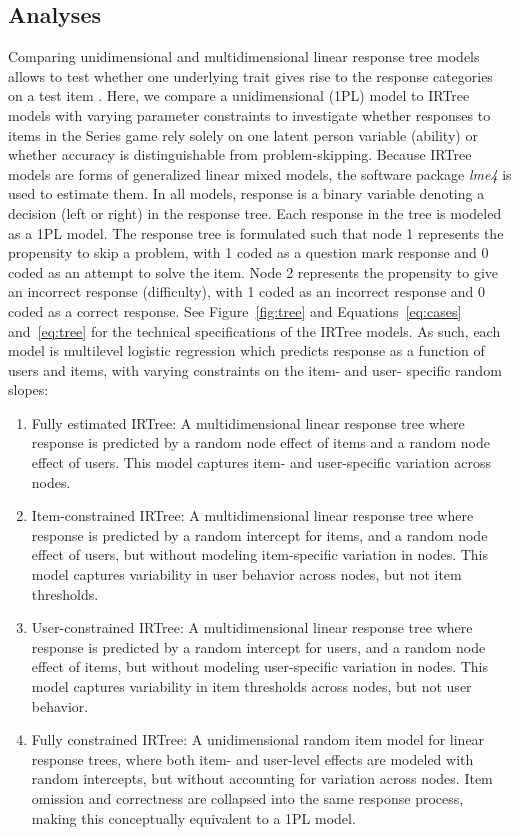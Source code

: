 \documentclass{edm_article}
\begin{document}
\subsection{Analyses}
\label{section:analyses}
Comparing unidimensional and multidimensional linear response tree models allows to test whether one underlying trait gives rise to the response categories on a test item \cite{de2012irtrees}. Here, we compare a unidimensional (1PL) model to IRTree models with varying parameter constraints to investigate whether responses to items in the Series game rely solely on one latent person variable (ability) or whether accuracy is distinguishable from problem-skipping. Because IRTree models are forms of generalized linear mixed models, the software package \textit{lme4} \cite{bates2015package} is used to estimate them. In all models, response is a binary variable denoting a decision (left or right) in the response tree. Each response in the tree is modeled as a 1PL model. The response tree is formulated such that node 1 represents the propensity to skip a problem, with 1 coded as a question mark response and 0 coded as an attempt to solve the item. Node 2 represents the propensity to give an incorrect response (difficulty), with 1 coded as an incorrect response and 0 coded as a correct response. See Figure~\ref{fig:tree} and Equations~\ref{eq:cases} and~\ref{eq:tree} for the technical specifications of the IRTree models. As such, each model is multilevel logistic regression which predicts response as a function of users and items, with varying constraints on the item- and user- specific random slopes: 

\begin{enumerate}
    \item Fully estimated IRTree: A multidimensional linear response tree where response is predicted by a random node effect of items and a random node effect of users. This model captures item- and user-specific variation across nodes. 
    \item Item-constrained IRTree: A multidimensional linear response tree where response is predicted by a random intercept for items, and a random node effect of users, but without modeling item-specific variation in nodes. This model captures variability in user behavior across nodes, but not item thresholds. 
    \item User-constrained IRTree: A multidimensional linear response tree where response is predicted by a random intercept for users, and a random node effect of items, but without modeling user-specific variation in nodes. This model captures variability in item thresholds across nodes, but not user behavior. 
    \item Fully constrained IRTree: A unidimensional random item model for linear response trees, where both item- and user-level effects are modeled with random intercepts, but without accounting for variation across nodes. Item omission and correctness are collapsed into the same response process, making this conceptually equivalent to a 1PL model. 
\end{enumerate}
\end{document}
